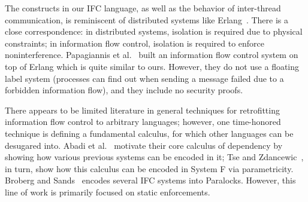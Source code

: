 

The constructs in our IFC language, as well as the behavior of
inter-thread communication, is reminiscent of distributed systems
like Erlang~\cite{Armstrong03makingreliable}.  There is a close
correspondence: in distributed systems, isolation is required due to
physical constraints; in information flow control, isolation is
required to enforce noninterference.  Papagiannis et al.~\cite{Papagiannis_enforcinguser}
built an information flow control system on top of Erlang which is quite
similar to ours.  However, they do not use a floating label system (processes
can find out when sending a message failed due to a forbidden information flow),
and they include no security proofs.

There appears to be limited literature in general techniques for retrofitting
information flow control to arbitrary languages; however, one time-honored
technique is defining a fundamental calculus, for which other languages can be
desugared into.  Abadi et al.~\cite{abadi+:core} motivate their core calculus of
dependency by showing how various previous systems can be encoded in it; Tse and
Zdancewic~\cite{Tse:Zdancewic:ICFP04}, in turn, show how this calculus can be
encoded in System F via parametricity.  Broberg and Sands~\cite{Broberg:2010}
encodes several IFC systems into Paralocks.  However, this line of work is
primarily focused on static enforcements.


